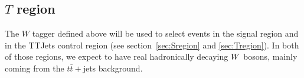 
\subsection{\texorpdfstring{$T$}{T} region \label{sec:boost_T_region}}

The $W$ tagger defined above will be used to select events in the signal region and in the TTJets
control region (see section~\ref{sec:Sregion} and \ref{sec:Tregion}). In both of those regions, we
expect to have real hadronically decaying $W$ bosons, mainly coming from the $t\bar{t}+$jets
background. 


% 
